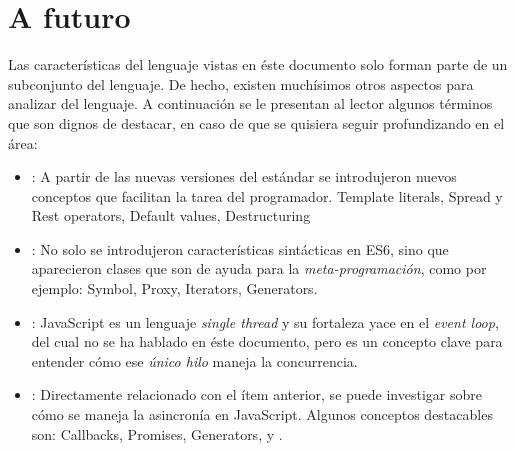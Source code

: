 \section{A futuro}

Las características del lenguaje vistas en éste documento solo forman parte de un subconjunto del lenguaje. De hecho, existen muchísimos otros aspectos para analizar del lenguaje. A continuación se le presentan al lector algunos términos que son dignos de destacar, en caso de que se quisiera seguir profundizando en el área:

\begin{itemize}
\item {}: A partir de las nuevas versiones del estándar se introdujeron nuevos conceptos que facilitan la tarea del programador. Template literals, Spread y Rest operators, Default values, Destructuring
\item {}: No solo se introdujeron características sintácticas en ES6, sino que aparecieron clases que son de ayuda para la \textit{meta-programación}, como por ejemplo: Symbol, Proxy, Iterators, Generators.
\item {}: JavaScript es un lenguaje \textit{single thread} y su fortaleza yace en el \textit{event loop}, del cual no se ha hablado en éste documento, pero es un concepto clave para entender cómo ese \textit{único hilo} maneja la concurrencia.
\item {}: Directamente relacionado con el ítem anterior, se puede investigar sobre cómo se maneja la asincronía en JavaScript. Algunos conceptos destacables son: Callbacks, Promises, Generators,  y .
\end{itemize}